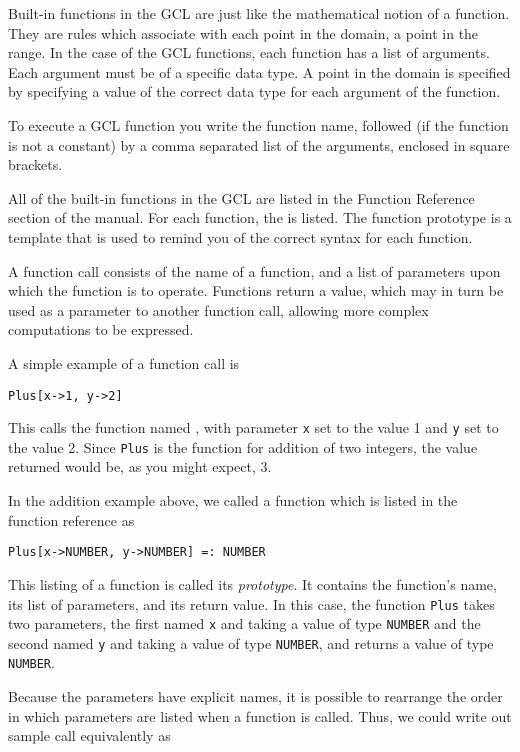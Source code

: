Built-in functions in the GCL are just like the mathematical notion of
a function.  They are rules which associate with each point in the  
domain, a point in the range.  In the case of the GCL functions, each
function has a list of arguments.  Each argument must be of a specific
data type.  A point in the domain is specified by specifying a value
of the correct data type for each argument of the function.  

To execute a GCL function you write the function name, followed
(if the function is not a constant) by a comma separated list of the
arguments, enclosed in square brackets.  

All of the built-in functions in the GCL are listed in the Function
Reference section of the manual.  For each function, the  is listed.  The function prototype is a template that is
used to remind you of the correct syntax for each function.  

A function call consists of the name of a function, and a list of
parameters upon which the function is to operate.  Functions return a
value, which may in turn be used as a parameter to another function
call, allowing more complex computations to be expressed.

A simple example of a function call is

\begin{verbatim}
Plus[x->1, y->2]
\end{verbatim}

This calls the function named , with parameter \verb+x+ set
to the value 1 and \verb+y+ set to the value 2.  Since {\tt Plus} is
the function for addition of two integers, the value returned would
be, as you might expect, 3.

In the addition example above, we called a function which is listed in
the function reference as

\begin{verbatim}
Plus[x->NUMBER, y->NUMBER] =: NUMBER
\end{verbatim}

\noindent This listing of a function is called its {\it prototype}.  
It contains the function's name, its list of parameters, and its return
value.  In this case, the function {\tt Plus} takes two parameters, the
first named \verb+x+ and taking a value of type {\tt NUMBER} and the
second named \verb+y+ and taking a value of type {\tt NUMBER}, and
returns a value of type {\tt NUMBER}.

Because the parameters have explicit names, it is possible to rearrange
the order in which parameters are listed when a function is called.
Thus, we could write out sample call equivalently as

